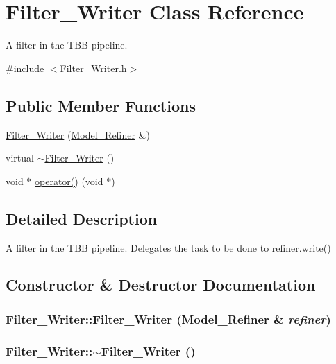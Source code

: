 \hypertarget{class_filter___writer}{
\section{Filter\_\-Writer Class Reference}
\label{class_filter___writer}
}


A filter in the TBB pipeline.  




{\ttfamily \#include $<$Filter\_\-Writer.h$>$}

\subsection*{Public Member Functions}
\begin{DoxyCompactItemize}
\item 
\hyperlink{class_filter___writer_ae80c050e1f7c9cd377d6e54422209f2e}{Filter\_\-Writer} (\hyperlink{class_model___refiner}{Model\_\-Refiner} \&)
\item 
virtual \hyperlink{class_filter___writer_a8ffc07908727a4a23c0f703c487db4cc}{$\sim$Filter\_\-Writer} ()
\item 
void $\ast$ \hyperlink{class_filter___writer_a54da214300ac51202c3661152155c8ae}{operator()} (void $\ast$)
\end{DoxyCompactItemize}


\subsection{Detailed Description}
A filter in the TBB pipeline. Delegates the task to be done to refiner.write() 

\subsection{Constructor \& Destructor Documentation}
\hypertarget{class_filter___writer_ae80c050e1f7c9cd377d6e54422209f2e}{
\subsubsection[{Filter\_\-Writer}]{\setlength{\rightskip}{0pt plus 5cm}Filter\_\-Writer::Filter\_\-Writer ({\bf Model\_\-Refiner} \& {\em refiner})}}
\label{class_filter___writer_ae80c050e1f7c9cd377d6e54422209f2e}
\hypertarget{class_filter___writer_a8ffc07908727a4a23c0f703c487db4cc}{
\subsubsection[{$\sim$Filter\_\-Writer}]{\setlength{\rightskip}{0pt plus 5cm}Filter\_\-Writer::$\sim$Filter\_\-Writer ()}}
\label{class_filter___writer_a8ffc07908727a4a23c0f703c487db4cc}


